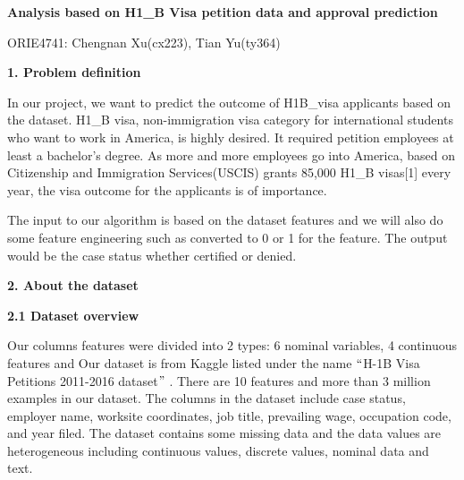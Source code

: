 \documentclass[12pt]{article}
\begin{document}
\begin{Center}
{\fontsize{16pt}{19.2pt}\selectfont \textbf{Analysis based on H1\_B Visa petition data and approval prediction}\par}
\end{Center}\par

\begin{Center}
{\fontsize{14pt}{16.8pt}\selectfont ORIE4741: Chengnan Xu(cx223), Tian Yu(ty364)\par}
\end{Center}\par


\vspace{\baselineskip}
{\fontsize{14pt}{16.8pt}\selectfont \textbf{1. Problem definition}\par}\par

\begin{justify}
In our project, we want to predict the outcome of H1B\_visa applicants based on the dataset. H1\_B visa, non-immigration visa category for international students who want to work in America, is highly desired. It required petition employees at least a bachelor’s degree. As more and more employees go into America, based on Citizenship and Immigration Services(USCIS) grants 85,000 H1\_B visas[1] every year, the visa outcome for the applicants is of importance. 
\end{justify}\par

\begin{justify}
The input to our algorithm is based on the dataset features and we will also do some feature engineering such as converted to 0 or 1 for the feature. The output would be the case status whether certified or denied.
\end{justify}\par


\vspace{\baselineskip}
{\fontsize{14pt}{16.8pt}\selectfont \textbf{2. About the dataset}\par}\par

\textbf{2.1 Dataset overview}\par

\begin{justify}
Our columns features were divided into 2 types: 6 nominal variables, 4 continuous features and Our dataset is from Kaggle listed under the name $``$H-1B Visa Petitions 2011-2016 dataset$"$ . There are 10 features and more than 3 million examples in our dataset. The columns in the dataset include case status, employer name, worksite coordinates, job title, prevailing wage, occupation code, and year filed. The dataset contains some missing data and the data values are heterogeneous including continuous values, discrete values, nominal data and text. 
\end{justify}\par
\end{document}
